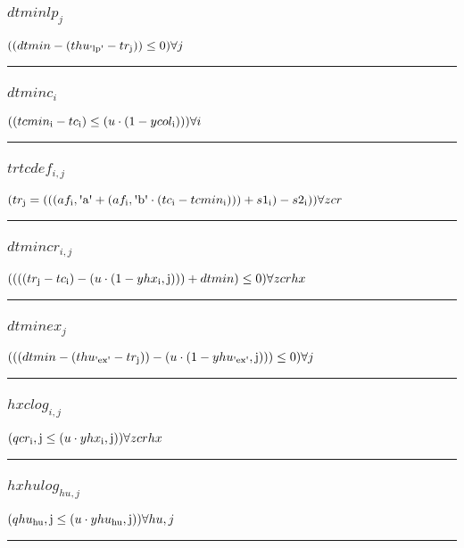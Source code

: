 \documentclass[11pt]{article}
\begin{document}
\subsubsection*{$dtminlp_{j}$}
$
((dtmin - (thu_\text{\textquotesingle lp\textquotesingle} - tr_\text{j})) \leq 0)\hfill \forall j
$
\vspace{5pt}
\hrule
\subsubsection*{$dtminc_{i}$}
$
((tcmin_\text{i} - tc_\text{i}) \leq (u \cdot (1 - ycol_\text{i})))\hfill \forall i
$
\vspace{5pt}
\hrule
\subsubsection*{$trtcdef_{i,j}$}
$
(tr_\text{j} = (((af_\text{i},\text{\textquotesingle a\textquotesingle} + (af_\text{i},\text{\textquotesingle b\textquotesingle} \cdot (tc_\text{i} - tcmin_\text{i}))) + s1_\text{i}) - s2_\text{i}))\hfill \forall zcr
$
\vspace{5pt}
\hrule
\subsubsection*{$dtmincr_{i,j}$}
$
((((tr_\text{j} - tc_\text{i}) - (u \cdot (1 - yhx_\text{i},\text{j}))) + dtmin) \leq 0)\hfill \forall zcrhx
$
\vspace{5pt}
\hrule
\subsubsection*{$dtminex_{j}$}
$
(((dtmin - (thu_\text{\textquotesingle ex\textquotesingle} - tr_\text{j})) - (u \cdot (1 - yhu_\text{\textquotesingle ex\textquotesingle},\text{j}))) \leq 0)\hfill \forall j
$
\vspace{5pt}
\hrule
\subsubsection*{$hxclog_{i,j}$}
$
(qcr_\text{i},\text{j} \leq (u \cdot yhx_\text{i},\text{j}))\hfill \forall zcrhx
$
\vspace{5pt}
\hrule
\subsubsection*{$hxhulog_{hu,j}$}
$
(qhu_\text{hu},\text{j} \leq (u \cdot yhu_\text{hu},\text{j}))\hfill \forall hu,j
$
\vspace{5pt}
\hrule
\end{document}
